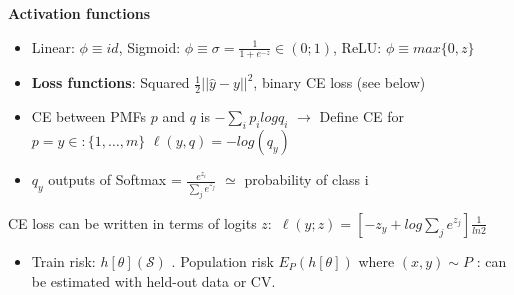 \textbf{Activation functions}
\begin{itemize}
    \item Linear: \(\phi \equiv id\), Sigmoid: \(\phi \equiv \sigma = \frac{1}{1+e^{-z}}\in (0;1)\), ReLU: \(\phi\equiv max\{0,z\}\)
\end{itemize}
\begin{itemize}
    \item \textbf{Loss functions}:  Squared \(\frac{1}{2}||\hat{y}-y||^2\), binary CE loss (see below)
    \item  CE between PMFs \(p\) and \(q\) is \(-\sum_i p_ilog q_i\) \(\rightarrow\) Define CE for \(p=y\in: \{1,\dots, m\}\) \(\ell (y,q) =-log(q_y)\)
    \item \(q_y\) outputs of Softmax = \(\frac{e^{z_i}}{\sum_j e^{z_j}}\) \(\simeq \) probability of class i
\end{itemize}
CE loss can be written in terms of logits \(z:\) \(\ell(y;z)=[-z_y+log\sum_je^{z_j}]\frac{1}{ln2}\)
\begin{itemize}
    \item Train risk: \(h[\theta](\mathcal{S})\) . Population risk \(E_P(h[\theta]) \) where \((x,y)\sim P\) : can be estimated with held-out data or CV.
\end{itemize}
